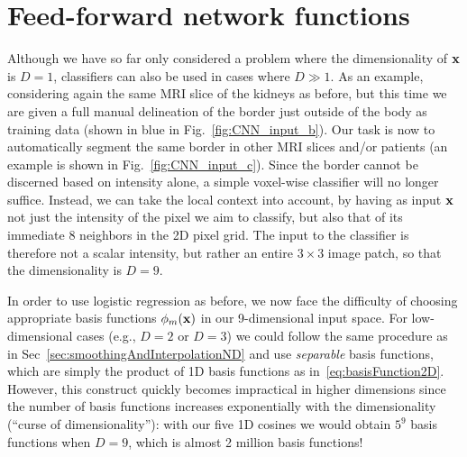 \documentclass[10pt,twoside]{book}
\begin{document}
\section{Feed-forward network functions}

Although we have so far 
only considered a problem
where the dimensionality of $\mathbf{x}$ is $D=1$, classifiers can also be used in cases where $D \gg 1$. 
As an example, considering again the same MRI slice of the kidneys as before, but this time we are given a full manual delineation of the border just outside of the body as training data (shown in blue in Fig.~\ref{fig:CNN_input_b}). Our task is now to automatically segment the same border in other MRI slices 
and/or patients (an example is shown in Fig.~\ref{fig:CNN_input_c}). Since the border cannot be discerned based on intensity alone, 
a simple voxel-wise classifier 
will no longer suffice.
Instead, we can take the local context into account, by having as input $\mathbf{x}$ not just the intensity of the pixel we aim to classify, but also that of its immediate 8 neighbors in the 2D pixel grid. The input to the classifier is therefore not a scalar intensity, but rather an entire $3\times3$ image patch, so that the dimensionality is $D=9$.

In order to use logistic regression as before, we now face the difficulty of choosing appropriate basis functions 
$\phi_m( \mathbf{x} )$ in our 9-dimensional input space. 
For low-dimensional cases (e.g., $D=2$ %
or $D=3$) 
we could follow the same procedure as in Sec~\ref{sec:smoothingAndInterpolationND} and use 
\emph{separable} basis functions, which are simply the product of 1D basis functions as in~\eqref{eq:basisFunction2D}.
% 
However, 
this 
construct
quickly becomes impractical in higher dimensions since the number of basis functions increases exponentially with the dimensionality (``curse of dimensionality''): 
with our five 1D cosines we would obtain $5^9$ basis functions when $D=9$,
which is 
almost 2 million basis functions!
\end{document}
